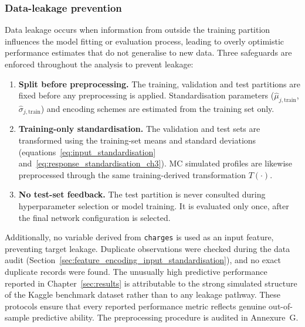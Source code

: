\subsubsection{Data-leakage prevention}
\label{sec:data_leakage_prevention}

Data leakage occurs when information from outside the training partition
influences the model fitting or evaluation process, leading to overly
optimistic performance estimates that do not generalise to new data.  Three
safeguards are enforced throughout the analysis to prevent leakage:

\begin{enumerate}
    \item \textbf{Split before preprocessing.}  The training, validation and
          test partitions are fixed before any preprocessing is applied.
          Standardisation parameters ($\widehat{\mu}_{j,\mathrm{train}}$,
          $\widehat{\sigma}_{j,\mathrm{train}}$) and encoding schemes are
          estimated from the training set only.

    \item \textbf{Training-only standardisation.}  The validation and test
          sets are transformed using the training-set means and standard
          deviations (equations~\eqref{eq:input_standardisation}
          and~\eqref{eq:response_standardisation_ch3}).  MC
          simulated profiles are likewise preprocessed through the same
          training-derived transformation $T(\cdot)$.

    \item \textbf{No test-set feedback.}  The test partition is never
          consulted during hyperparameter selection or model training.  It
          is evaluated only once, after the final network configuration is
          selected.
\end{enumerate}

Additionally, no variable derived from \texttt{charges} is used as an
input feature, preventing target leakage.  Duplicate observations were
checked during the data audit (Section~\ref{sec:feature_encoding_input_standardisation}),
and no exact duplicate records were found.  The unusually high predictive
performance reported in Chapter~\ref{sec:results} is attributable to the
strong simulated structure of the Kaggle benchmark dataset rather than to
any leakage pathway.  These protocols ensure that every reported performance metric
reflects genuine out-of-sample predictive ability.  The preprocessing
procedure is audited in Annexure~G.

